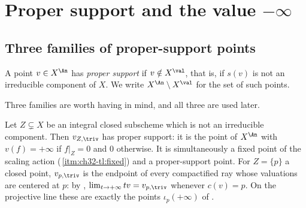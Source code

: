\section{Proper support and the value \texorpdfstring{$-\infty$}{-infinity}}
\label{sec:ch32-proper-support}

\subsection{Three families of proper-support points}
\label{sec:ch32-proper-support-examples}

\begin{definition}
\label{def:ch32-proper-support}
A point $v\in X^{\An}$ has \emph{proper support} if
$v\notin X^{\val}$, that is, if $s(v)$ is not an irreducible component of
$X$.  We write $X^{\An}\setminus X^{\val}$ for the set of such points.
\end{definition}

Three families are worth having in mind, and all three are used later.

\begin{example}
\label{ex:ch32-proper-support-trivial}
Let $Z\subsetneq X$ be an integral closed subscheme which is not an
irreducible component.  Then $v_{Z,\triv}$ has proper support: it is the
point of $X^{\An}$ with $v(f)=+\infty$ if $f|_Z=0$ and $0$ otherwise.
It is simultaneously a fixed point of the scaling action
(\,\cref{itm:ch32-tl:fixed}) and a
proper-support point.  For $Z=\{p\}$ a closed point, $v_{p,\triv}$ is the
endpoint of every compactified ray whose valuations are centered at $p$:
by , $\lim_{t\to+\infty}tv=v_{p,\triv}$
whenever $c(v)=p$.  On the projective line these are exactly the points
$\iota_p(+\infty)$ of .
\end{example}

